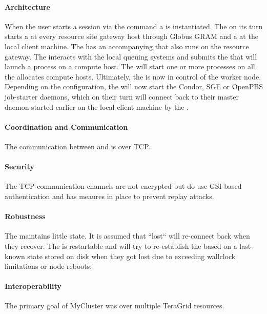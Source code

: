 \documentclass{sig-alternate}
\begin{document}
\paragraph{Architecture}
When the user starts a session via the  command a
 is instantiated.
The  on its turn starts a  at
every resource site gateway host through Globus GRAM and a  at the local client machine.
The  has an accompanying  that
also runs on the resource gateway.
The  interacts with the local queuing systems and
submits the  that will launch a 
process on a compute host.
The  will start one or more 
processes on all the allocates compute hosts.
Ultimately, the  is now in control of the worker
node.
Depending on the configuration, the  will now start
the Condor, SGE or OpenPBS job-starter daemons, which on their turn will
connect back to their master daemon started earlier on the local client machine
by the .

\paragraph{Coordination and Communication}
The communication between  and 
is over TCP.

\paragraph{Security}
The TCP communication channels are not encrypted but do use GSI-based
authentication and has meaures in place to prevent replay attacks.

\paragraph{Robustness}
The  maintains little state. It is assumed that ``lost``
 will re-connect back when they recover.
The  is restartable and will try to re-establish the
 based on a last-known state stored on disk when they got
lost due to exceeding wallclock limitations or node reboots;

\paragraph{Interoperability}
The primary goal of MyCluster was  over multiple TeraGrid
resources.
\end{document}
